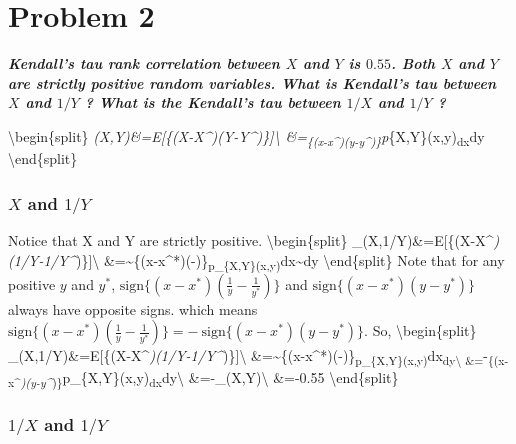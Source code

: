 \documentclass[11pt]{article}
\begin{document}
    \hypertarget{problem-2}{%
\section{Problem 2}\label{problem-2}}

    \textbf{\emph{Kendall's tau rank correlation between \(X\) and \(Y\) is
\(0.55\). Both \(X\) and \(Y\) are strictly positive random variables.
What is Kendall's tau between \(X\) and \(1/Y\) ? What is the Kendall's
tau between \(1/X\) and \(1/Y\) ?}}

    \textbackslash{}begin\{split\}
\rho\emph{\tau(X,Y)\&=E{[}\{(X-X\^{}\emph{)(Y-Y\^{}})\}{]}\textbackslash{}
\&=\int\int\textsubscript{\{(x-x\^{}\emph{)(y-y\^{}})\}}p}\{X,Y\}(x,y)\textsubscript{dx}dy
\textbackslash{}end\{split\}

    \hypertarget{x-and-1y}{%
\subsubsection{\texorpdfstring{\(X\) and
\(1/Y\)}{X and 1/Y}}\label{x-and-1y}}

    Notice that X and Y are strictly positive.
\textbackslash{}begin\{split\}
\rho\_\tau(X,1/Y)\&=E{[}\{(X-X\^{}\emph{)(1/Y-1/Y\^{}})\}{]}\textbackslash{}
\&=\int\int\textasciitilde{}\{(x-x\^{}*)(-)\}\textsubscript{p\_\{X,Y\}(x,y)}dx\textasciitilde{}dy
\textbackslash{}end\{split\} Note that for any positive \(y\) and
\(y^*\), \(\text{sign}\{(x-x^*)(\frac{1}{y}-\frac{1}{y^*})\}\) and
\(\text{sign}\{(x-x^*)(y-y^*)\}\) always have opposite signs. which
means
\(\text{sign}\{(x-x^*)(\frac{1}{y}-\frac{1}{y^*})\} = -~\text{sign}\{(x-x^*)(y-y^*)\}\).
So, \textbackslash{}begin\{split\}
\rho\_\tau(X,1/Y)\&=E{[}\{(X-X\^{}\emph{)(1/Y-1/Y\^{}})\}{]}\textbackslash{}
\&=\int\int\textasciitilde{}\{(x-x\^{}*)(-)\}\textsubscript{p\_\{X,Y\}(x,y)}dx\textsubscript{dy\textbackslash{}
\&=\int\int}-\textsubscript{\{(x-x\^{}\emph{)(y-y\^{}})\}}p\_\{X,Y\}(x,y)\textsubscript{dx}dy\textbackslash{}
\&=-\rho\_\tau(X,Y)\textbackslash{} \&=-0.55
\textbackslash{}end\{split\}

    \hypertarget{x-and-1y}{%
\subsubsection{\texorpdfstring{\(1/X\) and
\(1/Y\)}{1/X and 1/Y}}\label{x-and-1y}}
\end{document}
